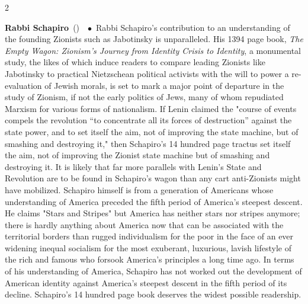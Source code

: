 \documentclass[10pt,a4paper,twoside]{article} %
\newcommand{\entry}[4]{\markboth{#1}{#1}\textbf{#1}\ {(#2)}\ \textit{#3}\ $\bullet$\ {#4}}  %
\begin{document}
\begin{multicols}{2}
\entry{Rabbi Schapiro} {} {} {Rabbi Schapiro's contribution to an understanding of the founding Zionists such as Jabotinsky is unparalleled. His 1394 page book, \emph{The Empty Wagon: Zionism's Journey from Identity Crisis to Identity}, a monumental study, the likes of which induce readers to compare leading Zionists like Jabotinsky to practical Nietzschean political activists with the will to power a re-evaluation of Jewish morals, is set to mark a major point of departure in the study of Zionism, if not the early politics of Jews, many of whom repudiated Marxism for various forms of nationalism. \newline \indent If Lenin claimed the "course of events compels the revolution “to concentrate all its forces of destruction” against the state power, and to set itself the aim, not of improving the state machine, but of smashing and destroying it," then Schapiro's 14 hundred page tractus set itself the aim, not of improving the Zionist state machine but of smashing and destroying it. It is likely that far more parallels with Lenin's State and Revolution are to be found in Schapiro's wagon than any cart anti-Zionists might have mobilized. 
\newline \indent Schapiro himself is from a generation of Americans whose understanding of America preceded the fifth period of America's steepest descent. He claims "Stars and Stripes" but America has neither stars nor stripes anymore; there is hardly anything about America now that can be associated with the territorial borders than rugged individualism for the poor in the face of an ever widening inequal socialism for the most exuberant, luxurious, lavish lifestyle of the rich and famous who forsook America's principles a long time ago. In terms of his understanding of America, Schapiro has not worked out the development of American identity against America's steepest descent in the fifth period of its decline. Schapiro's 14 hundred page book deserves the widest possible readership.}


\end{multicols}
\end{document}

